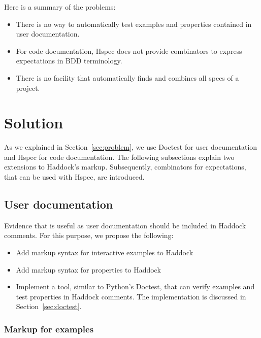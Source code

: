 \documentclass[preprint]{sigplanconf}
\begin{document}
Here is a summary of the problems:

\begin{itemize}
\item
    There is no way to automatically test examples and properties
    contained in user documentation.
\item
    For code documentation,
    Hspec does not provide combinators to express expectations in
    BDD terminology.
\item
    There is no facility that automatically finds and combines all
    specs of a project.
\end{itemize}

\section{Solution}

As we explained in Section~\ref{sec:problem},
we use Doctest for user documentation and Hspec for code documentation.
The following subsections explain two extensions to Haddock's markup.
Subsequently, combinators for expectations, that can be used with
Hspec, are introduced.

\subsection{User documentation}
\label{sec:user-doc}



Evidence that is useful as user documentation should be included in
Haddock comments.  For this purpose, we propose the following:

\begin{itemize}
\item Add markup syntax for interactive examples to Haddock
\item Add markup syntax for properties to Haddock
\item
    Implement a tool, similar to Python's Doctest, that can verify
    examples and test properties in Haddock comments.
    The implementation is discussed in Section~\ref{sec:doctest}.

\end{itemize}

\subsubsection{Markup for examples}
\end{document}
